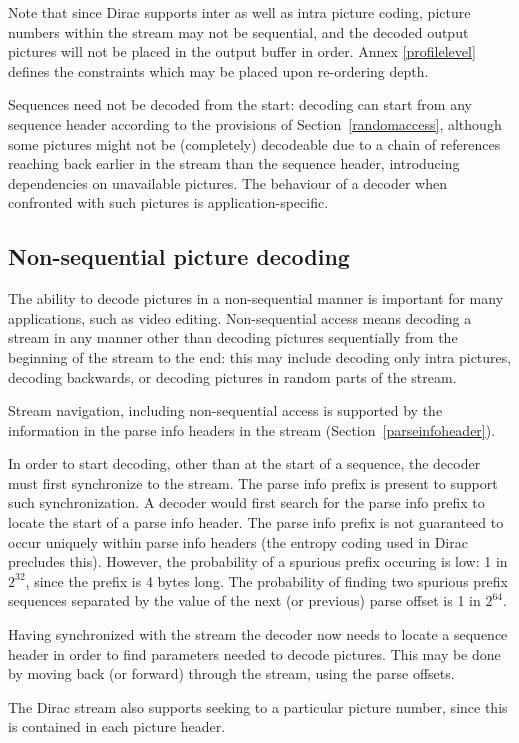 Note that since Dirac supports inter as well as intra picture coding, picture numbers
within the stream may not be sequential, and the decoded output pictures will not be
placed in the output buffer in order. Annex \ref{profilelevel} defines the constraints
which may be placed upon re-ordering depth.

Sequences need not be decoded from the start: decoding can start from any sequence header
according to the provisions of Section~\ref{randomaccess}, although some pictures might
not be (completely) decodeable due to a chain of references reaching back earlier in the stream
than the sequence header, introducing dependencies on unavailable pictures. 
The behaviour of a decoder when confronted with such pictures is application-specific.

\subsection{Non-sequential picture decoding}
\label{nonsequential}
The ability to decode pictures in a non-sequential manner is important for many
 applications, such as video editing. Non-sequential access means decoding a 
stream in any manner other than decoding pictures sequentially from the beginning 
of the stream to the end: this may include decoding only intra pictures, decoding backwards, or decoding pictures in random parts of the stream. 

Stream navigation, including non-sequential access is supported by the information 
in the parse info headers in the stream (Section~\ref{parseinfoheader}).

In order to start decoding, other than at the start of a sequence, the decoder 
must first synchronize to the stream. The parse info prefix is present to support such synchronization. A decoder would first search for the parse info prefix to locate 
the start of a parse info header. The parse info prefix is not guaranteed to occur
 uniquely within parse info headers (the entropy coding used in 
Dirac precludes this). However, the probability of a spurious 
prefix occuring is low: 1 in $2^{32}$, since the prefix is 4 bytes long. The probability of finding 
two spurious prefix sequences separated by the value of the next (or previous) parse 
offset is 1 in $2^{64}$.  

Having synchronized with the stream the decoder now needs to locate a sequence header 
in order to find parameters needed to decode pictures. This may be done by moving back (or forward) through the stream, using the parse offsets.

The Dirac stream also supports seeking to a particular picture number, since this
is contained in each picture header.

